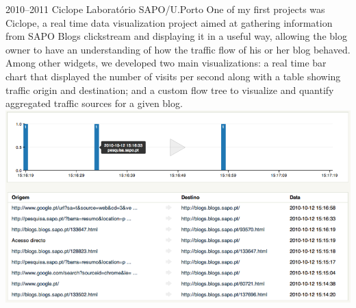 \documentclass{friggeri-cv}
\begin{document}
\begin{entrylist}
\entry
{2010--2011}
{Ciclope}
{Laboratório SAPO/U.Porto}
{One of my first projects was Ciclope, a real time data visualization project aimed at gathering information from SAPO Blogs clickstream and displaying it in a useful way, allowing the blog owner to have an understanding of how the traffic flow of his or her blog behaved.\\

Among other widgets, we developed two main visualizations: a real time bar chart that displayed the number of visits per second along with a table showing traffic origin and destination; and a custom flow tree to visualize and quantify aggregated traffic sources for a given blog.\\

\includegraphics[width=.85\columnwidth]{ciclope-realtime.png}\\}
\end{entrylist}

\begin{entrylist}
\end{entrylist}
\end{document}
